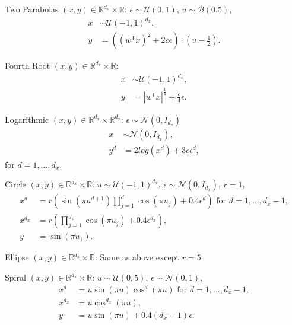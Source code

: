 \documentclass[11pt]{article}
\providecommand{\mc}[1]{\mathcal{#1}}
\newcommand{\Real}{\mathbb{R}}
\newcommand{\T}{^{\ensuremath{\mathsf{T}}}}           %
\begin{document}
\begin{compactenum}
\item Two Parabolas $(x,y) \in \Real^{d_{x}} \times \Real$: $\epsilon \sim \mc{U}(0,1)$, $u \sim \mc{B}(0.5)$,
\begin{align*}
x &\sim \mc{U}(-1,1)^{d_{x}},\\
y&=\left( (w\T x)^2  + 2c\epsilon\right) \cdot (u-\tfrac{1}{2}).
\end{align*}
\item Fourth Root $(x,y) \in \Real^{d_{x}} \times \Real$: 
\begin{align*}
x &\sim \mc{U}(-1,1)^{d_{x}},\\
y&=|w\T x|^\frac{1}{4}+\frac{c}{4}\epsilon.
\end{align*}
\item Logarithmic $(x,y) \in \Real^{d_{x}} \times \Real^{d_{x}}$: $\epsilon \sim \mc{N}(0, I_{d_{x}})$
\begin{align*}
x &\sim \mc{N}(0, I_{d_{x}}),\\
y^{d}&=2log(x^{d})+3c\epsilon^{d},
\end{align*}
for $d=1,\ldots,d_{x}$.
\item Circle $(x,y) \in \Real^{d_{x}} \times \Real$: $u \sim \mc{U}(-1,1)^{d_{x}}$, $\epsilon \sim \mc{N}(0, I_{d_{x}})$, $r=1$,
\begin{align*}
x^{d}&=r \left(\sin(\pi u^{d+1})  \prod_{j=1}^{d} \cos(\pi u_{j})+0.4 \epsilon^{d}\right) \mbox{ for $d=1,\ldots,d_{x}-1$},\\
x^{d_{x}}&=r \left(\prod_{j=1}^{d_{x}} \cos(\pi u_{j})+0.4 \epsilon^{d_{x}}\right),\\
y&= \sin(\pi u_{1}).
\end{align*}
\item Ellipse $(x,y) \in \Real^{d_{x}} \times \Real$: Same as above except $r=5$.

\item Spiral $(x,y) \in \Real^{d_{x}} \times \Real$: $u \sim \mc{U}(0,5)$, $\epsilon \sim \mc{N}(0, 1)$, 
\begin{align*}
x^{d}&=u \sin(\pi u)  \cos^{d}(\pi u) \mbox{ for $d=1,\ldots,d_{x}-1$},\\
x^{d_{x}}&=u \cos^{d_{x}}(\pi u),\\
y&= u \sin(\pi u) +0.4 (d_{x}-1)\epsilon.
\end{align*}


\end{compactenum}
\end{document}
